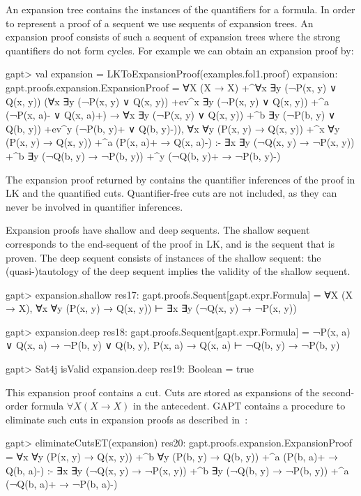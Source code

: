 \documentclass[a4paper,11pt]{book}
\newcommand{\impl}{\to} %
\newcommand{\cli}[1]{{\ttfamily {#1}}}
\begin{document}
An expansion tree contains the instances of the quantifiers for a formula.  In order
to represent a proof of a sequent we use sequents of expansion trees.  An
expansion proof consists of such a sequent of expansion trees where the
strong quantifiers do not form cycles.
For example we can obtain an expansion proof by:
\begin{clilisting}
gapt> val expansion = LKToExpansionProof(examples.fol1.proof)
expansion: gapt.proofs.expansion.ExpansionProof =
∀X (X → X)
  +^{∀x ∃y (¬P(x, y) ∨ Q(x, y))}
    (∀x ∃y (¬P(x, y) ∨ Q(x, y)) +ev^{x}
        ∃y (¬P(x, y) ∨ Q(x, y))
        +^{a} (¬P(x, a)- ∨ Q(x, a)+) →
      ∀x ∃y (¬P(x, y) ∨ Q(x, y))
        +^{b} ∃y (¬P(b, y) ∨ Q(b, y)) +ev^{y} (¬P(b, y)+ ∨ Q(b, y)-)),
∀x ∀y (P(x, y) → Q(x, y))
  +^{x} ∀y (P(x, y) → Q(x, y)) +^{a} (P(x, a)+ → Q(x, a)-)
:-
∃x ∃y (¬Q(x, y) → ¬P(x, y))
  +^{b} ∃y (¬Q(b, y) → ¬P(b, y)) +^{y} (¬Q(b, y)+ → ¬P(b, y)-)

\end{clilisting}

The expansion proof returned by \cli{LKToExpansionProof} contains the
quantifier inferences of the proof in LK and the quantified cuts.
Quantifier-free cuts are not included, as they can never be involved in
quantifier inferences.

Expansion proofs have shallow and deep sequents.  The shallow sequent
corresponds to the end-sequent of the proof in LK, and is the sequent that is
proven.  The deep sequent consists of instances of the shallow sequent: the
(quasi-)tautology of the deep sequent implies the validity of the shallow
sequent.
\begin{clilisting}
gapt> expansion.shallow
res17: gapt.proofs.Sequent[gapt.expr.Formula] = ∀X (X → X), ∀x ∀y (P(x, y) → Q(x, y)) ⊢ ∃x ∃y (¬Q(x, y) → ¬P(x, y))

gapt> expansion.deep
res18: gapt.proofs.Sequent[gapt.expr.Formula] = ¬P(x, a) ∨ Q(x, a) → ¬P(b, y) ∨ Q(b, y), P(x, a) → Q(x, a) ⊢ ¬Q(b, y) → ¬P(b, y)

gapt> Sat4j isValid expansion.deep
res19: Boolean = true

\end{clilisting}

This expansion proof contains a cut.  Cuts are stored as expansions of the
second-order formula $\forall X (X \impl X)$ in the antecedent.  GAPT contains
a procedure to eliminate such cuts in expansion proofs as described
in~\cite{Hetzl2013Expansion}:
\begin{clilisting}
gapt> eliminateCutsET(expansion)
res20: gapt.proofs.expansion.ExpansionProof =
∀x ∀y (P(x, y) → Q(x, y))
  +^{b} ∀y (P(b, y) → Q(b, y)) +^{a} (P(b, a)+ → Q(b, a)-)
:-
∃x ∃y (¬Q(x, y) → ¬P(x, y))
  +^{b} ∃y (¬Q(b, y) → ¬P(b, y)) +^{a} (¬Q(b, a)+ → ¬P(b, a)-)

\end{clilisting}
\end{document}
